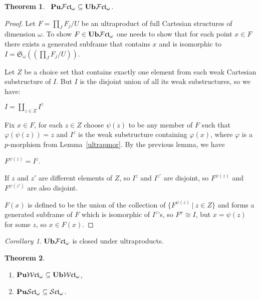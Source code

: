 \documentclass{article}
\theoremstyle{defin}
\theoremstyle{theorem}
\newtheorem{theorem}{Theorem}
\theoremstyle{claim}
\theoremstyle{prop}
\theoremstyle{lemma}
\theoremstyle{fact}
\theoremstyle{remark}
\theoremstyle{ex}
\theoremstyle{col}
\newtheorem{col}{Corollary}
\theoremstyle{question}
\begin{document}
\begin{theorem}~\label{puub}
${\bf Pu}\mathcal{F}\mathfrak{ct}_{\omega} \subseteq {\bf Ub}\mathcal{F}\mathfrak{ct}_{\omega}$.
\end{theorem}

\begin{proof}
Let $F = \prod \limits_J F_j / U$ be an ultraproduct of full Cartesian structures of dimension $\omega$. 
To show $F \in {\bf Ub}\mathcal{F}\mathfrak{ct}_{\omega}$ one needs to show that for each point $x \in F$ 
there exists a generated subframe that contains $x$ and is isomorphic to 
$I = \mathfrak{S}_{\omega}((\prod \limits_J F_j / U))$.

Let $Z$ be a choice set that contains exactly one element from each weak Cartesian substructure of $I$. 
But $I$ is the disjoint union of all its weak substructures, so we have:
\begin{center}
$I = \coprod \limits_{z \in Z} I^z$
\end{center}
Fix $x \in F$, for each $z \in Z$ choose $\psi(z)$ to be any member of $F$ such that 
$\varphi(\psi(z)) = z$ and $I^z$ is the weak substructure containing $\varphi(x)$, 
where $\varphi$ is a $p$-morphism from Lemma~\ref{ultrapmor}. By the previous lemma, we have
\begin{center}
$F^{\psi(z)} = I^z$.
\end{center}

If $z$ and $z'$ are different elements of $Z$, so $I^z$ and $I^{z'}$ are disjoint, 
so $F^{\psi(z)}$ and $F^{\psi(z')}$ are also disjoint. 

$F(x)$ is defined to be the union of the collection of $\{ F^{\psi(z)} \: | \: z \in Z \}$ and 
forms a generated subframe of $F$ which is isomorphic of $I^z$'s, so $F^x \cong I$,
but $x = \psi(z)$ for some $z$, so $x \in F(x)$. 
\end{proof}

\begin{col}
${\bf Ub}\mathcal{F}\mathfrak{ct}_{\omega}$ is closed under ultraproducts.
\end{col}

\begin{theorem} \label{sctomega}
$ $

\begin{enumerate}
\item ${\bf Pu}\mathcal{W}\mathfrak{ct}_{\omega} \subseteq {\bf Ub}\mathcal{W}\mathfrak{ct}_{\omega}$,
\item ${\bf Pu}\mathcal{S}\mathfrak{ct}_{\omega} \subseteq \mathcal{S}\mathfrak{ct}_{\omega}$.
\end{enumerate}
\end{theorem}
\end{document}
